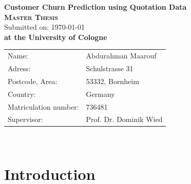 \documentclass[12pt,titlepage]{article}
\begin{document}
\thispagestyle{empty}

\begin{titlepage}\centering
    \begin{center}
        \vspace*{\fill}
        \huge \textbf{\textsf{Customer Churn Prediction using Quotation Data}}\\
        \vspace{2cm}
        \LARGE\textbf{\textsc{Master Thesis}}\\
        \vspace{1cm}
        \normalsize
        Submitted on: \today \\
        \vspace{2.5cm}
        \large \textbf{at the University of Cologne}
        \vspace{3cm}
    \end{center}
    \normalsize{
        \begin{tabular}{ll}
            Name: & {Abdurahman Maarouf} \\
            Adress: & {Schulstrasse 31} \\
            Postcode, Area: & {53332, Bornheim} \\
            Country: & {Germany} \\
            Matriculation number: & {736481} \\
            Supervisor: & {Prof. Dr. Dominik Wied} \\
        \end{tabular}\\
    }
    \vspace*{\fill}

\end{titlepage}

\thispagestyle{empty}

\tableofcontents

\newpage


\setcounter{page}{1}

\section{Introduction} \par
\end{document}
